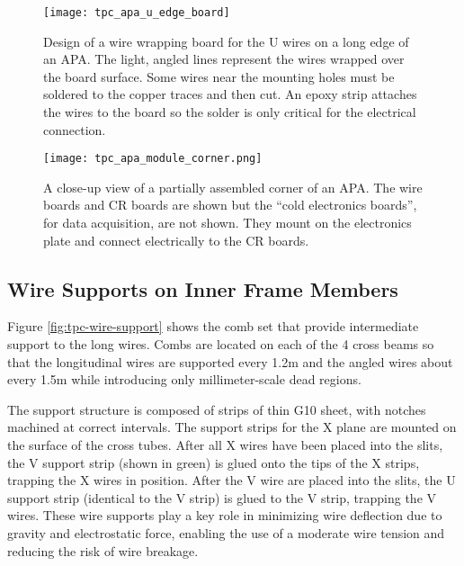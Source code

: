 \begin{figure}[htpb]
\centering
\texttt{[image: tpc\_apa\_u\_edge\_board]}
\caption{Design of a wire wrapping board for the U wires on a long edge of an APA. The light, angled lines represent the wires wrapped over the board surface. Some wires near the mounting holes must be soldered to the copper traces and then cut.  An epoxy strip attaches the wires to the board so the solder is only critical for the electrical connection.}
\label{fig:tpc-wire-board-u-side}
\end{figure}

\begin{figure}[htbp]
\centering
\texttt{[image: tpc\_apa\_module\_corner.png]}
\caption[Closeup view of a partially assembled corner of an APA]{A close-up view of a partially assembled corner of an APA.  The wire boards and CR boards are shown but the ``cold electronics boards'', for data acquisition, are not shown.  They mount on the electronics plate and connect electrically to the CR boards. }
\label{fig:tpc-APA-corner}
\end{figure}

\subsection{Wire Supports on Inner Frame Members}

Figure \ref{fig:tpc-wire-support} shows the comb set that provide intermediate support to the long wires.  Combs are located on each of the 4 cross beams so that the longitudinal wires are supported every 1.2m and the angled wires about every 1.5m while introducing only millimeter-scale dead regions.

The support structure is composed of strips of thin G10 sheet, with notches machined at correct intervals. The support strips for the X plane are mounted on the surface of the cross tubes.  After all X wires have been placed into the slits, the V support strip (shown in green) is glued onto the tips of the X strips, trapping the X wires in position.  After the V wire are placed into the slits, the U support strip (identical to the V strip) is glued to the V strip, trapping the V wires.  These wire supports play a key role in minimizing wire deflection due to gravity and electrostatic force, enabling the use of a moderate wire tension and reducing the risk of wire breakage.



